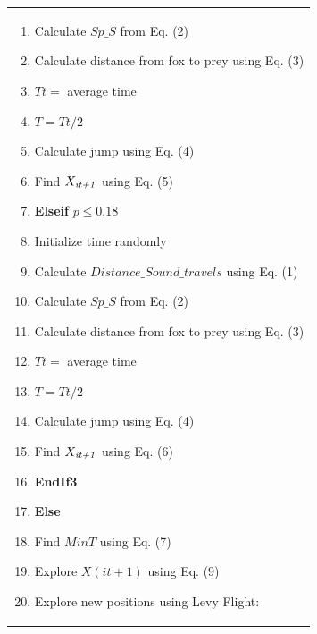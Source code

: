 \documentclass[
]{article}
\begin{document}
\begin{justify}
{\begin{minipage}[t]{\textwidth}
\begin{longtable}{@{}p{\dimexpr\linewidth-2\tabcolsep\relax}@{}}
\begin{minipage}[t]{\linewidth}
\begin{enumerate}
  \item \hspace{1.5cm} Calculate $Sp\_S$ from Eq. (2)
  \item \hspace{1.5cm} Calculate distance from fox to prey using Eq. (3)
  \item \hspace{1.5cm} $Tt =$ average time
  \item \hspace{1.5cm} $T=Tt/2$
  \item \hspace{1.5cm} Calculate jump using Eq. (4)
  \item \hspace{1.5cm} Find $X_{\text{\textit{it+1}}}$ using Eq. (5)
  \item \hspace{1cm} \textbf{Elseif} $p \leq 0.18$ 
  \item \hspace{1.5cm} Initialize time randomly
  \item \hspace{1.5cm} Calculate $Distance\_Sound\_travels$ using Eq. (1)
  \item \hspace{1.5cm} Calculate $Sp\_S$ from Eq. (2)
  \item \hspace{1.5cm} Calculate distance from fox to prey using Eq. (3) 
  \item \hspace{1.5cm} $Tt =$ average time
  \item \hspace{1.5cm} $T=Tt/2$
  \item \hspace{1.5cm} Calculate jump using Eq. (4)
  \item \hspace{1.5cm} Find $X_{\text{\textit{it+1}}}$ using Eq. (6)
  \item \hspace{1cm} \textbf{EndIf3}
    \item \hspace{0.5cm} \textbf{Else}
    \item \hspace{1cm} Find $MinT$ using Eq. (7)
    \item \hspace{1cm} Explore $X(it+1)$ using Eq. (9)
    \item \hspace{1cm} Explore new positions using Levy Flight:

\end{enumerate}
\end{minipage}
\end{longtable}
\end{minipage}}
\end{justify}
\end{document}
